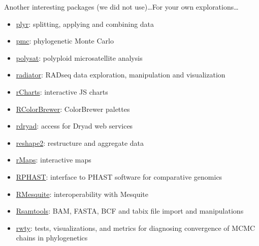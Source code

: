 \documentclass[compress, xelatex, 11pt, xcolor=svgnames, aspectratio=169, url={hyphens, lowtilde}]{beamer}
\begin{document}
\begin{frame}[allowframebreaks]{Another interesting packages (we did not use)\ldots}{For your own explorations\ldots}
\begin{itemize}
		\item \href{https://CRAN.R-project.org/package=plyr}{plyr}: splitting, applying and combining data
		\item \href{https://CRAN.R-project.org/package=pmc}{pmc}: phylogenetic Monte Carlo
		\item \href{https://CRAN.R-project.org/package=polysat}{polysat}: polyploid microsatellite analysis
		\item \href{https://github.com/thierrygosselin/radiator}{radiator}: RADseq data exploration, manipulation and visualization
		\item \href{https://github.com/ramnathv/rCharts}{rCharts}: interactive JS charts
		\item \href{https://CRAN.R-project.org/package=RColorBrewer}{RColorBrewer}: ColorBrewer palettes
		\item \href{https://CRAN.R-project.org/package=rdryad}{rdryad}: access for Dryad web services
		\item \href{https://CRAN.R-project.org/package=reshape2}{reshape2}: restructure and aggregate data
		\item \href{https://github.com/ramnathv/rMaps}{rMaps}: interactive maps
		\item \href{https://github.com/CshlSiepelLab/RPHAST}{RPHAST}: interface to PHAST software for comparative genomics
		\item \href{https://r-forge.r-project.org/projects/rmesquite/}{RMesquite}: interoperability with Mesquite
		\item \href{https://bioconductor.org/packages/release/bioc/html/Rsamtools.html}{Rsamtools}: BAM, FASTA, BCF and tabix file import and manipulations
		\item \href{https://CRAN.R-project.org/package=rwty}{rwty}: tests, visualizations, and metrics for diagnosing convergence of MCMC chains in phylogenetics

\end{itemize}
\end{frame}
\end{document}
